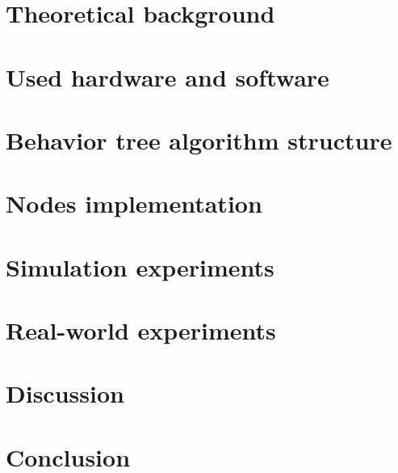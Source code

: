 \documentclass{ctuthesis}
\begin{document}
    \maketitle

    

    \chapter{Theoretical background}
        
        
        
        

    \chapter{Used hardware and software}
        
        
                

    \chapter{Behavior tree algorithm structure}
        

    \chapter{Nodes implementation}
        
        
        
        
    \chapter{Simulation experiments}
        

    \chapter{Real-world experiments}
        

    \chapter{Discussion}
        

    \chapter*{Conclusion}
        

    \appendix
        
        

        \printbibliography
\end{document}
